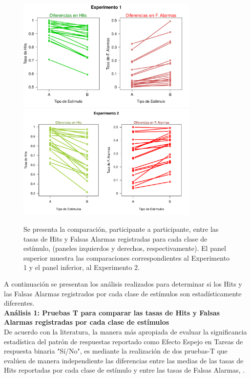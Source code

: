 \begin{figure}[th]
\centering
\includegraphics[width=0.80\textwidth]{Figures/Diff_Rate_E1}\\ 
\includegraphics[width=0.80\textwidth]{Figures/Diff_Rate_E2}
\caption[Diferencias entre las Tasas de Hits y Falsas Alarmas registradas en cada clase de estímulos]{Se presenta la comparación, participante a participante, entre las tasas de Hits y Falsas Alarmas registradas para cada clase de estímulo, (paneles izquierdos y derechos, respectivamente). El panel superior muestra las comparaciones correspondientes al Experimento 1 y el panel inferior, al Experimento 2.}
\label{fig:Diff_Rate}
\end{figure}

A continuación se presentan los análisis realizados para determinar si los Hits y las Falsas Alarmas registrados por cada clase de estímulos son estadísticamente diferentes.\\

\textbf{Análisis 1: Pruebas T para comparar las tasas de Hits y Falsas Alarmas registradas por cada clase de estímulos}\\

De acuerdo con la literatura, la manera más apropiada de evaluar la significancia estadística del patrón de respuestas reportado como Efecto Espejo en Tareas de respuesta binaria "Sí/No", es mediante la realización de dos pruebas-T que evalúen de manera independiente las diferencias entre las medias de las tasas de Hits reportadas por cada clase de estímulo y entre las tasas de Falsas Alarmas, \parencite{Glanzer1990}.\\

